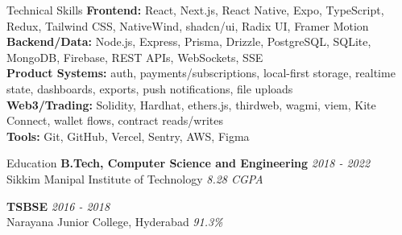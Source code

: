 \documentclass{resume}
\begin{document}
\begin{rSection}{Technical Skills}
{\bf Frontend:} React, Next.js, React Native, Expo, TypeScript, Redux, Tailwind CSS, NativeWind, shadcn/ui, Radix UI, Framer Motion \\
{\bf Backend/Data:} Node.js, Express, Prisma, Drizzle, PostgreSQL, SQLite, MongoDB, Firebase, REST APIs, WebSockets, SSE \\
{\bf Product Systems:} auth, payments/subscriptions, local-first storage, realtime state, dashboards, exports, push notifications, file uploads \\
{\bf Web3/Trading:} Solidity, Hardhat, ethers.js, thirdweb, wagmi, viem, Kite Connect, wallet flows, contract reads/writes \\
{\bf Tools:} Git, GitHub, Vercel, Sentry, AWS, Figma
\end{rSection}

\begin{rSection}{Education}
{\bf B.Tech, Computer Science and Engineering} \hfill {\em 2018 - 2022} \\
Sikkim Manipal Institute of Technology \hfill {\em 8.28 CGPA}

{\bf TSBSE} \hfill {\em 2016 - 2018} \\
Narayana Junior College, Hyderabad \hfill {\em 91.3\%}
\end{rSection}
\end{document}
